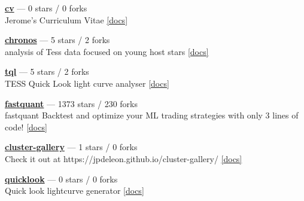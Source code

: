 \item \href{https://github.com/jpdeleon/cv}{{\bf cv}} --- 0 stars / 0 forks \\
Jerome's Curriculum Vitae \href{https://raw.githubusercontent.com/jpdeleon/cv/main-pdf/tex/cv_pubs.pdf}{[docs]}

\item \href{https://github.com/jpdeleon/chronos}{{\bf chronos}} --- 5 stars / 2 forks \\
analysis of Tess data focused on young host stars \href{None}{[docs]}

\item \href{https://github.com/jpdeleon/tql}{{\bf tql}} --- 5 stars / 2 forks \\
TESS Quick Look light curve analyser \href{None}{[docs]}

\item \href{https://github.com/enzoampil/fastquant}{{\bf fastquant}} --- 1373 stars / 230 forks \\
fastquant {\textemdash} Backtest and optimize your ML trading strategies with only 3 lines of code! \href{}{[docs]}

\item \href{https://github.com/jpdeleon/cluster-gallery}{{\bf cluster-gallery}} --- 1 stars / 0 forks \\
Check it out at https://jpdeleon.github.io/cluster-gallery/ \href{None}{[docs]}

\item \href{https://github.com/jpdeleon/quicklook}{{\bf quicklook}} --- 0 stars / 0 forks \\
Quick look lightcurve generator \href{None}{[docs]}